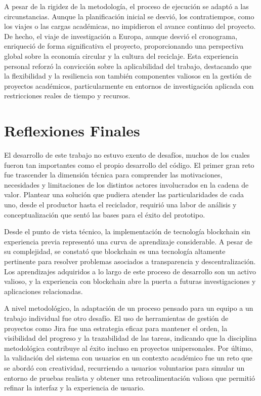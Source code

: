 A pesar de la rigidez de la metodología, el proceso de ejecución se adaptó a las circunstancias. Aunque la planificación inicial se desvió, los contratiempos, como los viajes o las cargas académicas, no impidieron el avance continuo del proyecto. De hecho, el viaje de investigación a Europa, aunque desvió el cronograma, enriqueció de forma significativa el proyecto, proporcionando una perspectiva global sobre la economía circular y la cultura del reciclaje. Esta experiencia personal reforzó la convicción sobre la aplicabilidad del trabajo, destacando que la flexibilidad y la resiliencia son también componentes valiosos en la gestión de proyectos académicos, particularmente en entornos de investigación aplicada con restricciones reales de tiempo y recursos.


\section{Reflexiones Finales}

El desarrollo de este trabajo no estuvo exento de desafíos, muchos de los cuales fueron tan importantes como el propio desarrollo del código. El primer gran reto fue trascender la dimensión técnica para comprender las motivaciones, necesidades y limitaciones de los distintos actores involucrados en la cadena de valor. Plantear una solución que pudiera atender las particularidades de cada uno, desde el productor hasta el reciclador, requirió una labor de análisis y conceptualización que sentó las bases para el éxito del prototipo.

Desde el punto de vista técnico, la implementación de tecnología blockchain sin experiencia previa representó una curva de aprendizaje considerable. A pesar de su complejidad, se constató que blockchain es una tecnología altamente pertinente para resolver problemas asociados a transparencia y descentralización. Los aprendizajes adquiridos a lo largo de este proceso de desarrollo son un activo valioso, y la experiencia con blockchain abre la puerta a futuras investigaciones y aplicaciones relacionadas.

A nivel metodológico, la adaptación de un proceso pensado para un equipo a un trabajo individual fue otro desafío. El uso de herramientas de gestión de proyectos como Jira fue una estrategia eficaz para mantener el orden, la visibilidad del progreso y la trazabilidad de las tareas, indicando que la disciplina metodológica contribuye al éxito incluso en proyectos unipersonales. Por último, la validación del sistema con usuarios en un contexto académico fue un reto que se abordó con creatividad, recurriendo a usuarios voluntarios para simular un entorno de pruebas realista y obtener una retroalimentación valiosa que permitió refinar la interfaz y la experiencia de usuario.

